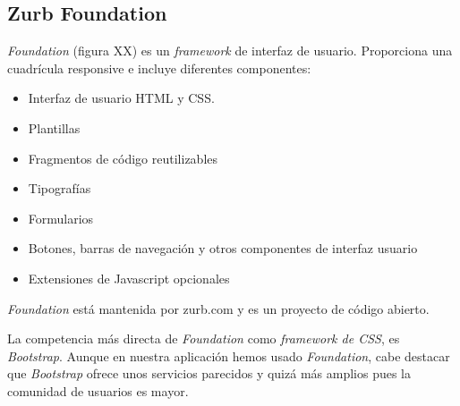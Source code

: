 
\subsection{Zurb Foundation}

\textit{Foundation\cite{web:foundation}} (figura XX) es un \textit{framework} de interfaz de usuario. Proporciona una cuadrícula responsive e incluye diferentes componentes:
\begin{itemize}
	\item Interfaz de usuario HTML y CSS.
	\item Plantillas
	\item Fragmentos de código reutilizables
	\item Tipografías
	\item Formularios
	\item Botones, barras de navegación y otros componentes de interfaz usuario
	\item Extensiones de Javascript opcionales
\end{itemize}

\textit{Foundation} está mantenida por zurb.com y es un proyecto de código abierto.

La competencia más directa de \textit{Foundation} como \textit{framework de CSS}, es \textit{Bootstrap}. Aunque en nuestra aplicación hemos usado \textit{Foundation}, cabe destacar que \textit{Bootstrap} ofrece unos servicios parecidos y quizá más amplios pues la comunidad de usuarios es mayor.


